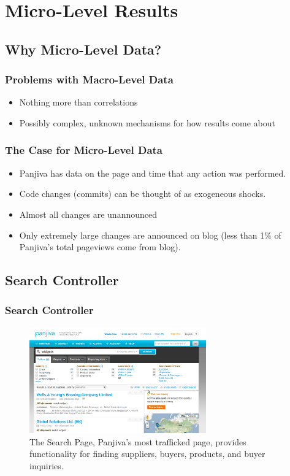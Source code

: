 \documentclass[xcolor=pdftex,dvipsnames,table]{beamer}
\begin{document}
\section{Micro-Level Results}

\subsection{Why Micro-Level Data?}

\frame{\tableofcontents[currentsubsection]}

\frame
{
    \frametitle{Problems with Macro-Level Data}
    \begin{itemize}
    \item Nothing more than correlations
    \item Possibly complex, unknown mechanisms for how results come about
    \end{itemize}
}

\frame
{
    \frametitle{The Case for Micro-Level Data}
    \begin{itemize}
    \item Panjiva has data on the page and time that any action was performed.
    \item Code changes (commits) can be thought of as exogeneous shocks.
    \item Almost all changes are unannounced
    \item Only extremely large changes are announced on blog (less than 1\% of Panjiva's total pageviews come from blog).
    \end{itemize}
}

\subsection{Search Controller}

\frame{\tableofcontents[currentsubsection]}

\frame
{
    \frametitle{Search Controller}
    \begin{figure}
    \centering
    \includegraphics[width=3in]{pictures/search_page.png}
    \caption{The Search Page, Panjiva's most trafficked page, provides functionality for finding suppliers, buyers, products, and buyer inquiries.}
    \end{figure}
}
\end{document}
